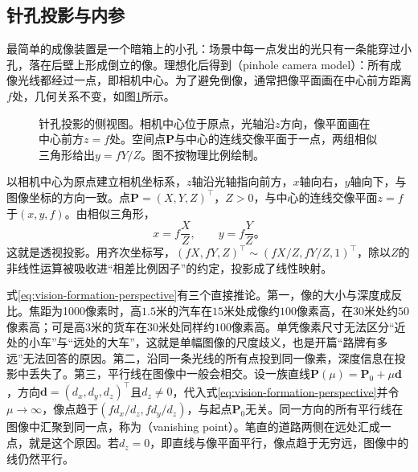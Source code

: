 \subsection{针孔投影与内参}
\label{sec:vision-formation-camera-intrinsics}

最简单的成像装置是一个暗箱上的小孔：场景中每一点发出的光只有一条能穿过小孔，落在后壁上形成倒立的像。理想化后得到（pinhole camera model）：所有成像光线都经过一点，即相机中心。为了避免倒像，通常把像平面画在中心前方距离$f$处，几何关系不变，如图\ref{fig:vision-formation-pinhole}所示。

\begin{figure}[htbp]
  \centering
  
  \caption{针孔投影的侧视图。相机中心位于原点，光轴沿$z$方向，像平面画在中心前方$z=f$处。空间点$\bm P$与中心的连线交像平面于一点，两组相似三角形给出$y=fY/Z$。图不按物理比例绘制。}
  \label{fig:vision-formation-pinhole}
\end{figure}

以相机中心为原点建立相机坐标系，$z$轴沿光轴指向前方，$x$轴向右，$y$轴向下，与图像坐标的方向一致。点$\bm P=(X,Y,Z)^\top$，$Z>0$，与中心的连线交像平面$z=f$于$(x,y,f)$。由相似三角形，
\begin{equation}
  x=f\frac{X}{Z},\qquad y=f\frac{Y}{Z}\text{。}
  \label{eq:vision-formation-perspective}
\end{equation}
这就是透视投影。用齐次坐标写，$(fX,fY,Z)^\top\sim(fX/Z,fY/Z,1)^\top$，除以$Z$的非线性运算被吸收进“相差比例因子”的约定，投影成了线性映射。

式\eqref{eq:vision-formation-perspective}有三个直接推论。第一，像的大小与深度成反比。焦距为1000像素时，高$1.5$米的汽车在$15$米处成像约$100$像素高，在$30$米处约$50$像素高；可是高$3$米的货车在$30$米处同样约$100$像素高。单凭像素尺寸无法区分“近处的小车”与“远处的大车”，这就是单幅图像的尺度歧义，也是开篇“路牌有多远”无法回答的原因。第二，沿同一条光线的所有点投到同一像素，深度信息在投影中丢失了。第三，平行线在图像中一般会相交。设一族直线$\bm P(\mu)=\bm P_0+\mu\bm d$，方向$\bm d=(d_x,d_y,d_z)^\top$且$d_z\ne0$，代入式\eqref{eq:vision-formation-perspective}并令$\mu\to\infty$，像点趋于$(fd_x/d_z,fd_y/d_z)$，与起点$\bm P_0$无关。同一方向的所有平行线在图像中汇聚到同一点，称为（vanishing point）。笔直的道路两侧在远处汇成一点，就是这个原因。若$d_z=0$，即直线与像平面平行，像点趋于无穷远，图像中的线仍然平行。

